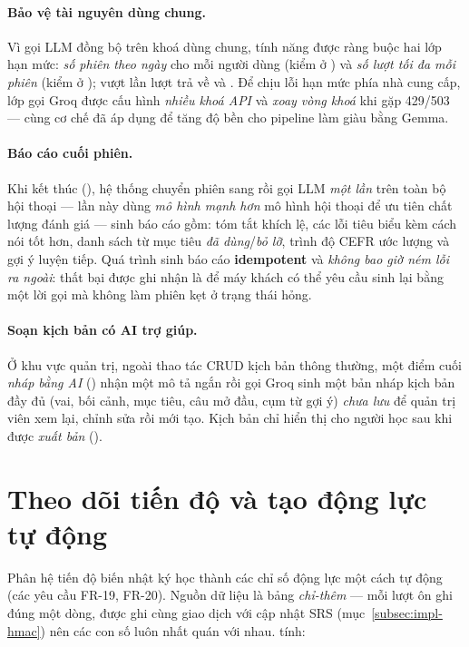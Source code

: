 \paragraph{Bảo vệ tài nguyên dùng chung.} Vì gọi LLM đồng bộ trên khoá dùng
chung, tính năng được ràng buộc hai lớp hạn mức: \textit{số phiên theo ngày}
cho mỗi người dùng (kiểm ở ) và \textit{số lượt tối đa mỗi phiên}
(kiểm ở ); vượt lần lượt trả về  và . Để
chịu lỗi hạn mức phía nhà cung cấp, lớp gọi Groq được cấu hình \textit{nhiều
khoá API} và \textit{xoay vòng khoá} khi gặp 429/503 --- cùng cơ chế đã áp
dụng để tăng độ bền cho pipeline làm giàu bằng Gemma.

\paragraph{Báo cáo cuối phiên.} Khi kết thúc (), hệ thống chuyển
phiên sang  rồi gọi LLM \textit{một lần} trên toàn bộ hội thoại
--- lần này dùng \textit{mô hình mạnh hơn} mô hình hội thoại để ưu tiên chất
lượng đánh giá --- sinh báo cáo gồm: tóm tắt khích lệ, các lỗi tiêu biểu kèm
cách nói tốt hơn, danh sách từ mục tiêu \textit{đã dùng}/\textit{bỏ lỡ},
trình độ CEFR ước lượng và gợi ý luyện tiếp. Quá trình sinh báo cáo
\textbf{idempotent} và \textit{không bao giờ ném lỗi ra ngoài}: thất bại được
ghi nhận là  để máy khách có thể yêu cầu sinh
lại bằng một lời gọi  mà không làm phiên kẹt ở trạng thái hỏng.

\paragraph{Soạn kịch bản có AI trợ giúp.} Ở khu vực quản trị, ngoài thao tác
CRUD kịch bản thông thường, một điểm cuối \textit{nháp bằng AI}
() nhận một mô tả ngắn rồi gọi Groq sinh
một bản nháp kịch bản đầy đủ (vai, bối cảnh, mục tiêu, câu mở đầu, cụm từ gợi
ý) \textit{chưa lưu} để quản trị viên xem lại, chỉnh sửa rồi mới tạo. Kịch bản
chỉ hiển thị cho người học sau khi được \textit{xuất bản}
().

\section{Theo dõi tiến độ và tạo động lực tự động}
\label{sec:tien-do}

Phân hệ tiến độ biến nhật ký học thành các chỉ số động lực một cách tự động
(các yêu cầu FR-19, FR-20). Nguồn dữ liệu là bảng \textit{chỉ-thêm}
 --- mỗi lượt ôn ghi đúng một dòng, được ghi cùng giao
dịch với cập nhật SRS (mục~\ref{subsec:impl-hmac}) nên các con số luôn nhất
quán với nhau.  tính:

